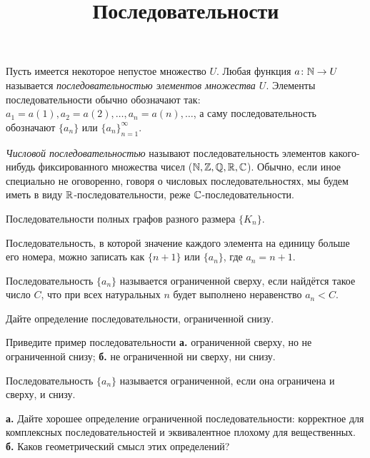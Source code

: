 \documentclass[a4paper, 12pt, num=24]{listok}
\begin{document}
\title{Последовательности}
\maketitle{}
\begin{definition}
	Пусть имеется некоторое непустое множество $U$.
	Любая функция $a \colon \mathbb{N} \to U$ называется \textit{последовательностью элементов множества $U$}.
	Элементы последовательности обычно обозначают так: $a_1 = a(1), a_2 = a(2), \ldots, a_n = a(n), \ldots$,
	а саму последовательность обозначают $\{a_n\}$ или ${\{a_n\}}_{n = 1}^{\infty}$.

	\textit{Числовой последовательностью} называют последовательность элементов какого-нибудь фиксированного множества чисел ($\mathbb{N}, \mathbb{Z}, \mathbb{Q}, \mathbb{R}, \mathbb{C}$).
	Обычно, если иное специально не оговоренно, говоря о числовых последовательностях, мы будем иметь в виду $\mathbb{R}$-последовательности, реже $\mathbb{C}$-последовательности.
\end{definition}
\begin{example}
	Последовательности полных графов разного размера $\{K_n\}$.
\end{example}
\begin{example}
	Последовательность, в которой значение каждого элемента на единицу больше его номера,
	можно записать как $\{n + 1\}$ или $\{a_n\}$, где $a_n = n + 1$.
\end{example}
\begin{definition}
	Последовательность $\{a_n\}$ называется ограниченной сверху, если найдётся такое число $C$,
	что при всех натуральных $n$ будет выполнено неравенство $a_n < C$.
\end{definition}
\begin{problem}
	Дайте определение последовательности, ограниченной снизу.
\end{problem}
\begin{problem}
	Приведите пример последовательности \textbf{а.} ограниченной сверху, но не ограниченной снизу;
	\textbf{б.} не ограниченной ни сверху, ни снизу.
\end{problem}
\begin{definition}[плохое]
	Последовательность $\{a_n\}$ называется ограниченной, если она ограничена и сверху, и снизу.
\end{definition}
\begin{problem}
	\textbf{а.} Дайте хорошее определение ограниченной последовательности: корректное для комплексных последовательностей и эквивалентное плохому для вещественных.
	\textbf{б.} Каков геометрический смысл этих определений?
\end{problem}
\end{document}
